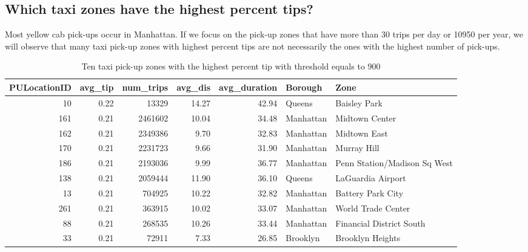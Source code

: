 \documentclass[12pt,twoside]{reedthesis}
\newenvironment{Shaded}{\begin{snugshade}}{\end{snugshade}}
\newcommand{\KeywordTok}[1]{\textcolor[rgb]{0.13,0.29,0.53}{\textbf{#1}}}
\newcommand{\DecValTok}[1]{\textcolor[rgb]{0.00,0.00,0.81}{#1}}
\newcommand{\StringTok}[1]{\textcolor[rgb]{0.31,0.60,0.02}{#1}}
\newcommand{\CommentTok}[1]{\textcolor[rgb]{0.56,0.35,0.01}{\textit{#1}}}
\newcommand{\OperatorTok}[1]{\textcolor[rgb]{0.81,0.36,0.00}{\textbf{#1}}}
\newcommand{\NormalTok}[1]{#1}
\theoremstyle{definition}
\theoremstyle{definition}
\theoremstyle{definition}
\theoremstyle{remark}
\begin{document}
\subsection{Which taxi zones have the highest percent
tips?}\label{which-taxi-zones-have-the-highest-percent-tips}

Most yellow cab pick-ups occur in Manhattan. If we focus on the pick-up
zones that have more than 30 trips per day or 10950 per year, we will
observe that many taxi pick-up zones with highest percent tips are not
necessarily the ones with the highest number of pick-ups.
\begin{Shaded}
\end{Shaded}
\begin{table}

\caption{\label{tab:unnamed-chunk-34}Ten taxi pick-up zones with the highest percent tip with threshold equals to 900}
\centering
\begin{tabular}[t]{r|r|r|r|r|l|l}
\hline
PULocationID & avg\_tip & num\_trips & avg\_dis & avg\_duration & Borough & Zone\\
\hline
10 & 0.22 & 13329 & 14.27 & 42.94 & Queens & Baisley Park\\
\hline
161 & 0.21 & 2461602 & 10.04 & 34.48 & Manhattan & Midtown Center\\
\hline
162 & 0.21 & 2349386 & 9.70 & 32.83 & Manhattan & Midtown East\\
\hline
170 & 0.21 & 2231723 & 9.66 & 31.90 & Manhattan & Murray Hill\\
\hline
186 & 0.21 & 2193036 & 9.99 & 36.77 & Manhattan & Penn Station/Madison Sq West\\
\hline
138 & 0.21 & 2059444 & 11.90 & 36.10 & Queens & LaGuardia Airport\\
\hline
13 & 0.21 & 704925 & 10.22 & 32.82 & Manhattan & Battery Park City\\
\hline
261 & 0.21 & 363915 & 10.02 & 33.07 & Manhattan & World Trade Center\\
\hline
88 & 0.21 & 268535 & 10.26 & 33.44 & Manhattan & Financial District South\\
\hline
33 & 0.21 & 72911 & 7.33 & 26.85 & Brooklyn & Brooklyn Heights\\
\hline
\end{tabular}
\end{table}
\end{document}
